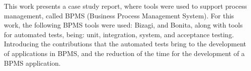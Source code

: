 This work presents a case study report, where tools were used to support process management, called BPMS (Business Process Management System). For this work, the following BPMS tools were used: Bizagi, and Bonita, along with tools for automated tests, being: unit, integration, system, and acceptance testing. Introducing the contributions that the automated tests bring to the development of applications in BPMS, and the reduction of the time for the development of a BPMS application.


